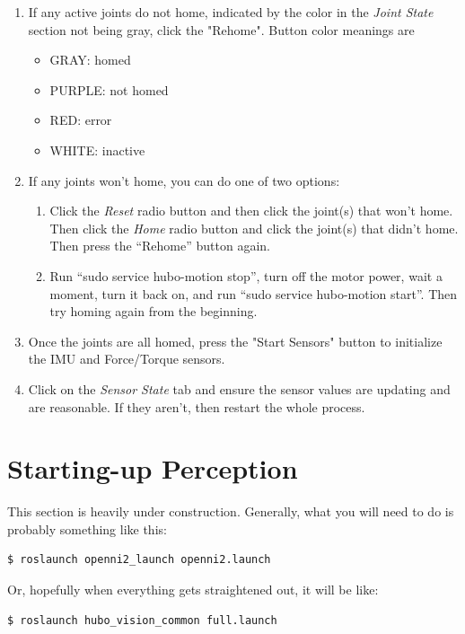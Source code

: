 \documentclass[letterpaper, 10 pt]{report}
\begin{document}
\begin{enumerate}
  \item If any active joints do not home, indicated by the color in the \textit{Joint State} section not being gray, click the "Rehome". Button color meanings are
    \begin{itemize}
      \item GRAY: homed
      \item PURPLE: not homed
      \item RED: error
      \item WHITE: inactive
    \end{itemize}
  \item If any joints won't home, you can do one of two options:
    \begin{enumerate}
      \item Click the \textit{Reset} radio button and then click the joint(s) that won't home. Then click the \textit{Home} radio button and click the joint(s) that didn't home. Then press the ``Rehome'' button again.
      \item Run ``sudo service hubo-motion stop'', turn off the motor power, wait a moment, turn it back on, and run ``sudo service hubo-motion start''. Then try homing again from the beginning.
    \end{enumerate}
  \item Once the joints are all homed, press the "Start Sensors" button to initialize the IMU and Force/Torque sensors.
  \item Click on the \textit{Sensor State} tab and ensure the sensor values are updating and are reasonable. If they aren't, then restart the whole process.
\end{enumerate}

\section{Starting-up Perception} \label{sec:starting-up-perception}
This section is heavily under construction. Generally, what you will need to do is probably something like this:
  \begin{lstlisting}[language=bash]
    $ roslaunch openni2_launch openni2.launch
  \end{lstlisting}
Or, hopefully when everything gets straightened out, it will be like:
  \begin{lstlisting}[language=bash]
    $ roslaunch hubo_vision_common full.launch
  \end{lstlisting}

\pagebreak
\end{document}
